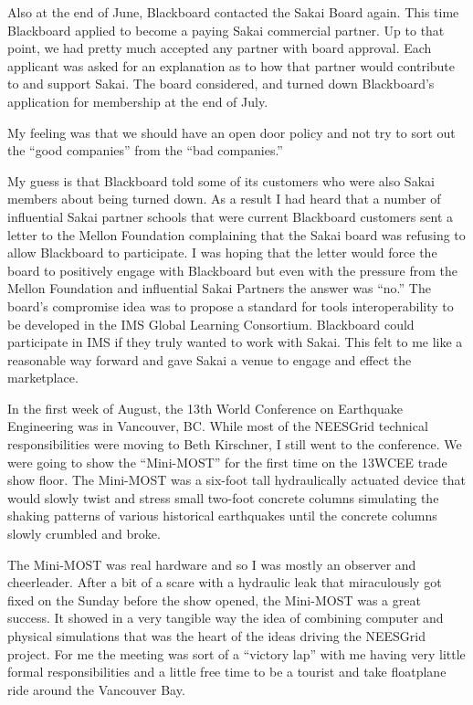 \documentclass[12pt]{book}
\begin{document}


Also at the end of June, Blackboard contacted the
Sakai Board again.   This time Blackboard applied to become
a paying Sakai commercial partner.  Up to that
point, we had pretty much accepted any partner with board approval.
Each applicant was
asked for an explanation as to how
that partner would contribute to and support Sakai.  The
board considered, and
turned down Blackboard's application for membership
at the end of July.

My feeling was that we should have an open door
policy and not try to sort out the ``good companies'' from
the ``bad companies.''

My guess is that Blackboard
told some of its customers who were also Sakai members about being turned down.
As a result I had heard that a number of influential
Sakai partner schools that were current Blackboard
customers sent a letter to the Mellon Foundation
complaining that the Sakai board was refusing to allow
Blackboard to participate.
I was hoping that the letter would force the board to
positively engage with Blackboard but even with the
pressure from the Mellon Foundation and
influential Sakai Partners the answer was ``no.''
The board's compromise idea was to propose a standard
for tools interoperability to be developed
in the IMS Global Learning
Consortium.   Blackboard could participate in IMS
if they truly wanted to work with Sakai.
This felt to me like a reasonable way forward and
gave Sakai a venue to engage and effect the marketplace.


In the first week of August, the 13th World Conference
on Earthquake Engineering was in Vancouver, BC.  While 
most of the NEESGrid technical responsibilities 
were moving to Beth Kirschner, I still went to the 
conference.  We were going to show the ``Mini-MOST'' for
the first time on the 13WCEE trade show floor.  The 
Mini-MOST was a six-foot tall hydraulically actuated device
that would slowly twist and stress small two-foot 
concrete columns simulating the shaking patterns of 
various historical earthquakes until the concrete
columns slowly crumbled and broke.

The Mini-MOST was real hardware and so I was mostly an observer
and cheerleader.   After a bit of a scare with a hydraulic leak
that miraculously got fixed on the Sunday before the show opened,
the Mini-MOST was a great success.  It showed in a very tangible
way the idea of combining computer and physical simulations that
was the heart of the ideas driving the NEESGrid project.  For me
the meeting was sort of a ``victory lap'' with me having very little 
formal responsibilities and a little free time to be a tourist and 
take floatplane ride around the Vancouver Bay.
\end{document}
